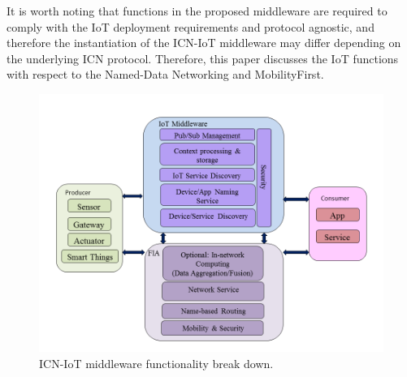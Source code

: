 It is worth noting that functions in the proposed middleware are required to comply with the IoT deployment requirements and protocol agnostic, and therefore the instantiation of the ICN-IoT middleware may differ depending on the underlying ICN protocol. Therefore, this paper discusses the IoT functions with respect to the Named-Data Networking and  MobilityFirst.
\vspace{-1mm}
\begin{figure}
\centering
\includegraphics[width=\columnwidth]{figure/middleware_architecture.png}
\caption{\label{fig:mid_arch} ICN-IoT middleware functionality break down.}
\end{figure}
